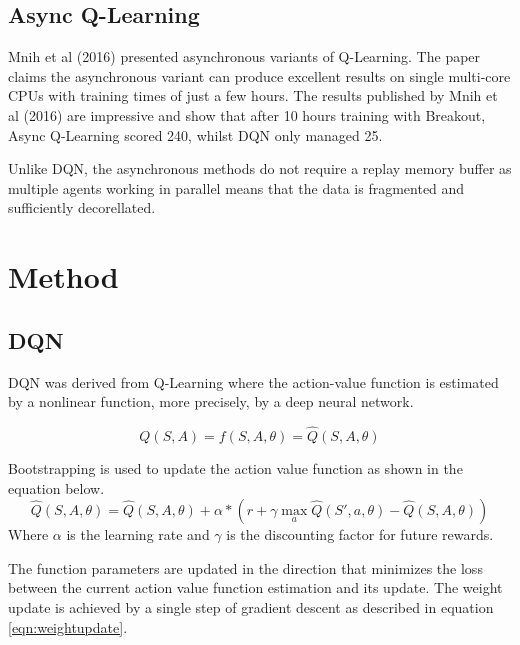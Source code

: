 \documentclass{article}
\begin{document}
\subsection{Async Q-Learning}

Mnih et al (2016) presented asynchronous variants of Q-Learning.
The paper claims the asynchronous variant can produce excellent results on single multi-core CPUs with training times of just a few hours. The results published by Mnih et al (2016) are impressive and show that after 10 hours training with Breakout, Async Q-Learning scored 240, whilst DQN only managed 25.

Unlike DQN, the asynchronous methods do not require a replay memory buffer as multiple agents working in parallel means that the data is fragmented and sufficiently decorellated.

\section{Method}
\subsection{DQN}

DQN was derived from Q-Learning where the action-value function is estimated by a nonlinear function, more precisely, by a deep neural network.

\begin{equation}
Q(S,A) = f(S,A,\theta) = \hat{Q}(S,A,\theta)
\end{equation}

Bootstrapping is used to update the action value function as shown in the equation below.
\begin{equation}
\hat{Q}(S,A,\theta) = \hat{Q}(S,A,\theta) + \alpha * \left( r + \gamma \max_{a} \hat{Q}(S',a,\theta) - \hat{Q}(S,A,\theta) \right)
\end{equation}
Where $\alpha$ is the learning rate and $\gamma$ is the discounting factor for future rewards.

The function parameters are updated in the direction that minimizes the loss between the current action value function estimation and its update. The weight update is achieved by a single step of gradient descent as described in equation \ref{eqn:weightupdate}.
\end{document}
